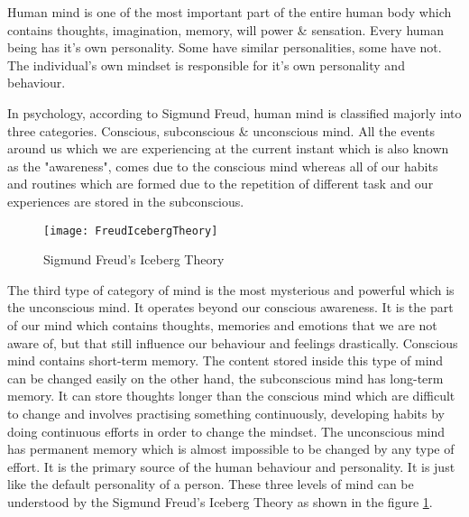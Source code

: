 Human mind is one of the most important part of the entire human body which contains thoughts, imagination, memory, will power \& sensation. Every human being has it's own personality. Some have similar personalities, some have not. The individual's own mindset is responsible for it's own personality and behaviour.

In psychology, according to Sigmund Freud, human mind is classified majorly into three categories. Conscious, subconscious \& unconscious mind. All the events around us which we are experiencing at the current instant which is also known as the "awareness", comes due to the conscious mind whereas all of our habits and routines which are formed due to the repetition of different task and our experiences are stored in the subconscious.
 
\begin{figure}[H]
	\texttt{[image: FreudIcebergTheory]}
	\caption{Sigmund Freud's Iceberg Theory}
	\label{Fig:fig1}
\end{figure}

The third type of category of mind is the most mysterious and powerful which is the unconscious mind. It operates beyond our conscious awareness. It is the part of our mind which contains thoughts, memories and emotions that we are not aware of, but that still influence our behaviour and feelings drastically. Conscious mind contains short-term memory. The content stored inside this type of mind can be changed easily on the other hand, the subconscious mind has long-term memory. It can store thoughts longer than the conscious mind which are difficult to change and involves practising something continuously, developing habits by doing continuous efforts in order to change the mindset. The unconscious mind has permanent memory which is almost impossible to be changed by any type of effort. It is the primary source of the human behaviour and personality. It is just like the default personality of a person. These three levels of mind can be understood by the Sigmund Freud's Iceberg Theory as shown in the figure \ref{Fig:fig1}.
